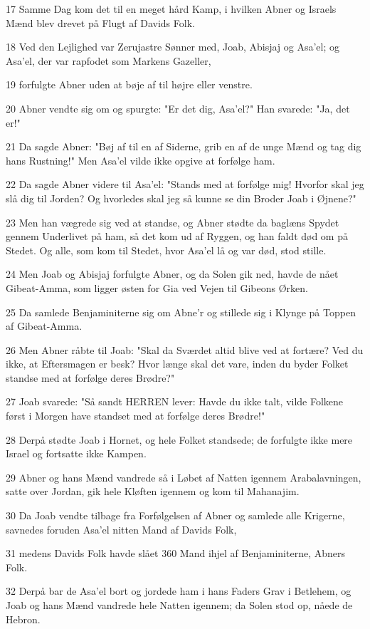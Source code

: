 \par 17 Samme Dag kom det til en meget hård Kamp, i hvilken Abner og Israels Mænd blev drevet på Flugt af Davids Folk.
\par 18 Ved den Lejlighed var Zerujastre Sønner med, Joab, Abisjaj og Asa'el; og Asa'el, der var rapfodet som Markens Gazeller,
\par 19 forfulgte Abner uden at bøje af til højre eller venstre.
\par 20 Abner vendte sig om og spurgte: "Er det dig, Asa'el?" Han svarede: "Ja, det er!"
\par 21 Da sagde Abner: "Bøj af til en af Siderne, grib en af de unge Mænd og tag dig hans Rustning!" Men Asa'el vilde ikke opgive at forfølge ham.
\par 22 Da sagde Abner videre til Asa'el: "Stands med at forfølge mig! Hvorfor skal jeg slå dig til Jorden? Og hvorledes skal jeg så kunne se din Broder Joab i Øjnene?"
\par 23 Men han vægrede sig ved at standse, og Abner stødte da baglæns Spydet gennem Underlivet på ham, så det kom ud af Ryggen, og han faldt død om på Stedet. Og alle, som kom til Stedet, hvor Asa'el lå og var død, stod stille.
\par 24 Men Joab og Abisjaj forfulgte Abner, og da Solen gik ned, havde de nået Gibeat-Amma, som ligger østen for Gia ved Vejen til Gibeons Ørken.
\par 25 Da samlede Benjaminiterne sig om Abne'r og stillede sig i Klynge på Toppen af Gibeat-Amma.
\par 26 Men Abner råbte til Joab: "Skal da Sværdet altid blive ved at fortære? Ved du ikke, at Eftersmagen er besk? Hvor længe skal det vare, inden du byder Folket standse med at forfølge deres Brødre?"
\par 27 Joab svarede: "Så sandt HERREN lever: Havde du ikke talt, vilde Folkene først i Morgen have standset med at forfølge deres Brødre!"
\par 28 Derpå stødte Joab i Hornet, og hele Folket standsede; de forfulgte ikke mere Israel og fortsatte ikke Kampen.
\par 29 Abner og hans Mænd vandrede så i Løbet af Natten igennem Arabalavningen, satte over Jordan, gik hele Kløften igennem og kom til Mahanajim.
\par 30 Da Joab vendte tilbage fra Forfølgelsen af Abner og samlede alle Krigerne, savnedes foruden Asa'el nitten Mand af Davids Folk,
\par 31 medens Davids Folk havde slået 360 Mand ihjel af Benjaminiterne, Abners Folk.
\par 32 Derpå bar de Asa'el bort og jordede ham i hans Faders Grav i Betlehem, og Joab og hans Mænd vandrede hele Natten igennem; da Solen stod op, nåede de Hebron.

